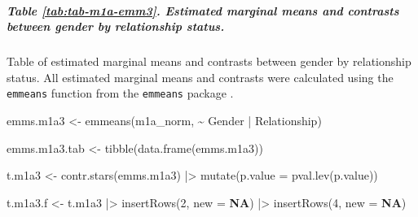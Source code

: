 \documentclass[
  bookmarksnumbered]{article}
\newenvironment{Shaded}{\begin{snugshade}}{\end{snugshade}}
\newcommand{\AttributeTok}[1]{\textcolor[rgb]{0.80,0.80,0.80}{#1}}
\newcommand{\ConstantTok}[1]{\textcolor[rgb]{0.86,0.64,0.64}{\textbf{#1}}}
\newcommand{\DecValTok}[1]{\textcolor[rgb]{0.86,0.86,0.80}{#1}}
\newcommand{\FunctionTok}[1]{\textcolor[rgb]{0.94,0.94,0.56}{#1}}
\newcommand{\NormalTok}[1]{\textcolor[rgb]{0.80,0.80,0.80}{#1}}
\newcommand{\OtherTok}[1]{\textcolor[rgb]{0.94,0.94,0.56}{#1}}
\newcommand{\SpecialCharTok}[1]{\textcolor[rgb]{0.86,0.64,0.64}{#1}}
\begin{document}
\subparagraph{Table \ref{tab:tab-m1a-emm3}. Estimated marginal means and contrasts between gender by relationship status.}\label{table-reftabtab-m1a-emm3.-estimated-marginal-means-and-contrasts-between-gender-by-relationship-status.}

Table of estimated marginal means and contrasts between gender by relationship status. All estimated marginal means and contrasts were calculated using the \texttt{emmeans} function from the \texttt{emmeans} package \autocite{emmeanscit}.

\begin{Shaded}
\begin{Highlighting}[]
\NormalTok{emms.m1a3 }\OtherTok{\textless{}{-}} \FunctionTok{emmeans}\NormalTok{(m1a\_norm, }\SpecialCharTok{\textasciitilde{}}\NormalTok{ Gender }\SpecialCharTok{|}\NormalTok{ Relationship)}

\NormalTok{emms.m1a3.tab }\OtherTok{\textless{}{-}} \FunctionTok{tibble}\NormalTok{(}\FunctionTok{data.frame}\NormalTok{(emms.m1a3))}

\NormalTok{t.m1a3 }\OtherTok{\textless{}{-}} \FunctionTok{contr.stars}\NormalTok{(emms.m1a3) }\SpecialCharTok{|\textgreater{}}
  \FunctionTok{mutate}\NormalTok{(}\AttributeTok{p.value =} \FunctionTok{pval.lev}\NormalTok{(p.value))}

\NormalTok{t.m1a3.f }\OtherTok{\textless{}{-}}\NormalTok{ t.m1a3 }\SpecialCharTok{|\textgreater{}}
  \FunctionTok{insertRows}\NormalTok{(}\DecValTok{2}\NormalTok{, }\AttributeTok{new =} \ConstantTok{NA}\NormalTok{) }\SpecialCharTok{|\textgreater{}}
  \FunctionTok{insertRows}\NormalTok{(}\DecValTok{4}\NormalTok{, }\AttributeTok{new =} \ConstantTok{NA}\NormalTok{)}


\end{Highlighting}
\end{Shaded}
\end{document}
